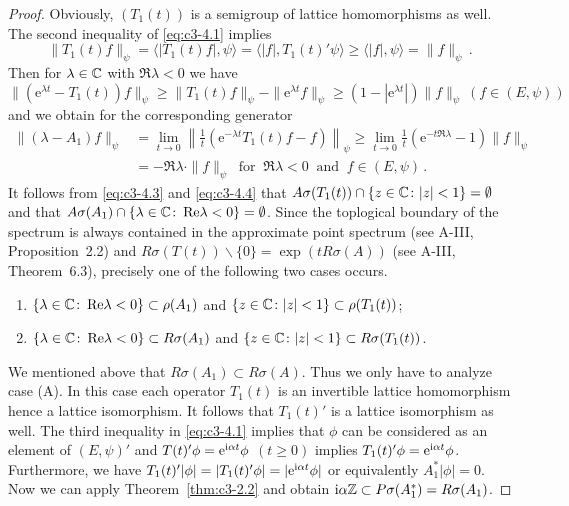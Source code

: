 \begin{proof}
	Obviously, $(T_{1}(t))$ is a semigroup of lattice homomorphisms as well. 
	The second inequality of \eqref{eq:c3-4.1} implies
	\begin{equation}\label{eq:c3-4.3}
	\|T_{1}(t)f\|_{\psi} = \langle|T_{1}(t)f|,\psi\rangle = \langle|f|,T_{1}(t)'\psi\rangle \geq \langle|f|,\psi\rangle = \|f\|_{\psi}\,.
	\end{equation}
	Then for $\lambda \in \mathbb{C} $ with $\Re \lambda < 0$ we have 
	\[ 
	\|(\mathrm{e}^{\lambda t}-T_{1}(t))f\|_{\psi} \geq \|T_{1}(t)f\|_{\psi}-\|\mathrm{e}^{\lambda t}f\|_{\psi} \geq (1-|\mathrm{e}^{\lambda t}|)\|f\|_{\psi} \ (f \in (E,\psi))
	\]
	and we obtain for the corresponding generator
	\begin{equation}\label{eq:c3-4.4}
		\begin{aligned}
		\|(\lambda-A_{1})f\|_{\psi} &= \lim_{t \to 0}\left\|\frac{1}{t}(\mathrm{e}^{-\lambda t}T_{1}(t)f-f)\right\|_{\psi} \geq \lim_{t \to 0}\frac{1}{t}(\mathrm{e}^{-t\Re \lambda}-1)\|f\|_{\psi}\\
		&= -\Re \lambda\cdot\|f\|_{\psi} \ \text{ for } \ \Re \lambda < 0 \ \text{ and } \ f \in (E,\psi)\,.
		\end{aligned}
	\end{equation}
	It follows from \eqref{eq:c3-4.3} and \eqref{eq:c3-4.4} that $A\sigma(T_{1}(t))\cap\{z \in \mathbb{C}  \colon |z| < 1\} = \emptyset$ and that $A\sigma(A_{1})\cap\{\lambda \in \mathbb{C}  \colon \mathop{}\!\mathrm{Re} \lambda < 0\} = \emptyset$. 
	Since the toplogical boundary of the spectrum is always contained in the approximate point spectrum (see A-III, Proposition~2.2) and $R\sigma(T(t))\backslash\{0\} = \exp(tR\sigma(A))$ (see A-III, Theorem~6.3), precisely one of the following two cases occurs.
	\begin{enumerate}[\upshape (A)]
		\item
		$\{\lambda \in \mathbb{C}  \colon \mathop{}\!\mathrm{Re} \lambda < 0\} \subset \rho(A_{1})$ and $\{z \in \mathbb{C}  \colon |z| < 1\} \subset \rho(T_{1}(t))$;
		
		\item
		$\{\lambda \in \mathbb{C}  \colon \mathop{}\!\mathrm{Re} \lambda < 0\} \subset R\sigma(A_{1})$ and $\{z \in \mathbb{C}  \colon |z| < 1\} \subset R\sigma(T_{1}(t))$.
	\end{enumerate}
	
	We mentioned above that $R\sigma(A_{1}) \subset R\sigma(A)$. 
	Thus we only have to analyze case (A). 
	In this case each operator $T_{1}(t)$ is an invertible lattice homomorphism hence a lattice isomorphism. 
	It follows that $T_{1}(t)'$ is a lattice isomorphism as well. 
	The third inequality in \eqref{eq:c3-4.1} implies that $\phi$ can be considered as an element of $(E,\psi)'$ and $T(t)'\phi = \mathrm{e}^{\mathrm{i}\alpha t}\phi$ $(t \geq 0)$ implies $T_{1}(t)'\phi = \mathrm{e}^{\mathrm{i}\alpha t}\phi$. 
	Furthermore, we have
	$T_{1}(t)'|\phi| = |T_{1}(t)'\phi| = |\mathrm{e}^{\mathrm{i}\alpha t}\phi|$ or equivalently $A_{1}^*|\phi| = 0$.
	Now we can apply 
	Theorem~\ref{thm:c3-2.2} 
	and obtain $\mathrm{i}\alpha\mathbb{Z} \subset P\sigma(A_{1}^*) = R\sigma(A_{1})$.
	\end{proof}

